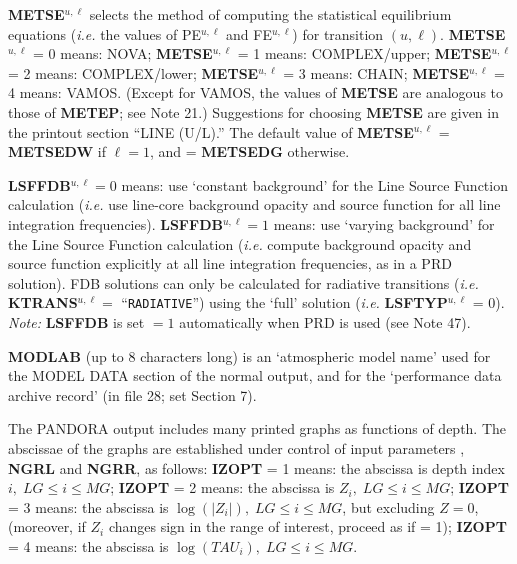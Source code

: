 \blankline
\blankline
\centerline{}
\space \noindent
{\bf METSE}$^{u,\ell}$ selects the method of computing the statistical 
equilibrium equations ({\it i.e.} the values of PE$^{u,\ell}$ and 
FE$^{u,\ell}$) for transition $(u,\ell)$. \np
{\bf METSE}$^{u, \ell}$ = 0 means: NOVA; \np
{\bf METSE}$^{u, \ell}$ = 1 means: COMPLEX/upper; \np
{\bf METSE}$^{u, \ell}$ = 2 means: COMPLEX/lower; \np
{\bf METSE}$^{u, \ell}$ = 3 means: CHAIN; \np
{\bf METSE}$^{u, \ell}$ = 4 means: VAMOS. \np
(Except for VAMOS, the values of {\bf METSE} are analogous to those
of {\bf METEP}; see Note 21.) 
Suggestions for choosing {\bf METSE} are given in the printout
section ``LINE (U/L).'' 
The default value of {\bf METSE}$^{u, \ell}$ = {\bf METSEDW} if
$\ell = 1$, and = {\bf METSEDG} otherwise.
\ej
\centerline{}
\space \noindent
{\bf LSFFDB}$^{u,\ell} = 0$ means: use `constant background' for the Line
Source Function calculation ({\it i.e.} use line-core background opacity
and source function for all line integration frequencies).
{\bf LSFFDB}$^{u,\ell} = 1$ means: use `varying background' for the Line
Source Function calculation ({\it i.e.} compute background opacity and
source function explicitly at all line integration frequencies, as in a
PRD solution). FDB solutions can only be calculated for radiative
transitions ({\it i.e.} {\bf KTRANS}$^{u,\ell} =$ ``{\tt RADIATIVE}'')
using the `full' solution ({\it i.e.} {\bf LSFTYP}$^{u,\ell}$ = 0). \np
{\it Note:} {\bf LSFFDB} is set $= 1$ automatically when PRD is 
used (see Note 47).
\blankline
\blankline
\centerline{}
\space \noindent
{\bf MODLAB} (up to 8 characters long) is an `atmospheric model name'
used for the MODEL DATA section of the normal output, and for the
`performance data archive record' (in file 28; set Section 7).
\blankline
\blankline
\centerline{}
\space \noindent
The PANDORA output includes many printed graphs as functions of depth. \break
The abscissae of the graphs are established under control of input
parameters , {\bf NGRL} and {\bf NGRR},
as follows: \np
{\bf IZOPT} = 1 means: the abscissa is depth index $i, \; LG \leq i \leq MG$;
\np
{\bf IZOPT} = 2 means: the abscissa is $Z_i, \; LG \leq i \leq MG$; \np
{\bf IZOPT} = 3 means: the abscissa is $\log ( |Z_i| ), \; LG \leq i
\leq MG$, but excluding \break $Z=0$, (moreover, if $Z_i$ changes sign in the
range of interest, proceed as if  = 1); \np
{\bf IZOPT} = 4 means: the abscissa is $\log(TAU_i), \; LG \leq i \leq MG$.

